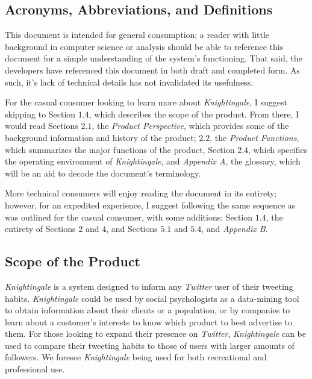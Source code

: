 \documentclass[a4paper, 12pt]{article}
\begin{document}
\subsection{Acronyms, Abbreviations, and Definitions} \label{sec:abbr}
\begin{adjustwidth}{2em}{0pt}
This document is intended for general consumption; a reader with little background in computer science or analysis should be able to reference this document for a simple understanding of the system’s functioning. That said, the developers have referenced this document in both draft and completed form. As such, it’s lack of technical details has not invalidated its usefulness. \newline

\noindent For the casual consumer looking to learn more about \textit{Knightingale}, I suggest skipping to Section $1.4$, which describes the scope of the product. From there, I would read Sections $2.1$, the \textit{Product Perspective}, which provides some of the background information and history of the product; $2.2$, the \textit{Product Functions}, which summarizes the major functions of the product, Section $2.4$, which specifies the operating environment of \textit{Knightingale}, and \textit{Appendix A}, the glossary, which will be an aid to decode the document’s terminology. \newline

\noindent More technical consumers will enjoy reading the document in its entirety; however, for an expedited experience, I suggest following the same sequence as was outlined for the casual consumer, with some additions: Section $1.4$, the entirety of Sections $2$ and $4$, and Sections $5.1$ and $5.4$, and \textit{Appendix B}. \newline
\end{adjustwidth}

\subsection{Scope of the Product} \label{sec:scope}
\begin{adjustwidth}{2em}{0pt}
\textit{Knightingale} is a system designed to inform any \textit{Twitter} user of their tweeting habits. \textit{Knightingale} could be used by social psychologists as a data-mining tool to obtain information about their clients or a population, or by companies to learn about a customer's interests to know which product to best advertise to them. For those looking to expand their presence on \textit{Twitter}, \textit{Knightingale} can be used to compare their tweeting habits to those of users with larger amounts of followers. We foresee \textit{Knightingale} being used for both recreational and professional use.
\end{adjustwidth}
\end{document}
